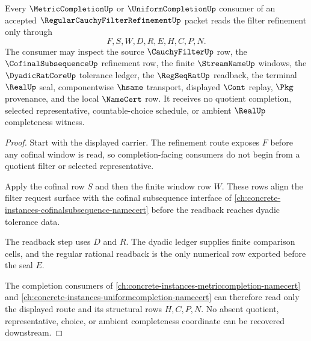 \begin{theorem}
\label{thm:regular-cauchy-filter-refinement-handoff}
Every $\MetricCompletionUp$ or $\UniformCompletionUp$ consumer of an accepted $\RegularCauchyFilterRefinementUp$ packet reads the filter refinement only through
$$
F,S,W,D,R,E,H,C,P,N .
$$
The consumer may inspect the source $\CauchyFilterUp$ row, the $\CofinalSubsequenceUp$ refinement row, the finite $\StreamNameUp$ windows, the $\DyadicRatCoreUp$ tolerance ledger, the $\RegSeqRatUp$ readback, the terminal $\RealUp$ seal, componentwise $\hsame$ transport, displayed $\Cont$ replay, $\Pkg$ provenance, and the local $\NameCert$ row. It receives no quotient completion, selected representative, countable-choice schedule, or ambient $\RealUp$ completeness witness.
\end{theorem}
\begin{proof}
Start with the displayed carrier. The refinement route exposes $F$ before any cofinal window is read, so completion-facing consumers do not begin from a quotient filter or selected representative.

Apply the cofinal row $S$ and then the finite window row $W$. These rows align the filter request surface with the cofinal subsequence interface of \autoref{ch:concrete-instances-cofinalsubsequence-namecert} before the readback reaches dyadic tolerance data.

The readback step uses $D$ and $R$. The dyadic ledger supplies finite comparison cells, and the regular rational readback is the only numerical row exported before the seal $E$.

The completion consumers of \autoref{ch:concrete-instances-metriccompletion-namecert} and \autoref{ch:concrete-instances-uniformcompletion-namecert} can therefore read only the displayed route and its structural rows $H,C,P,N$. No absent quotient, representative, choice, or ambient completeness coordinate can be recovered downstream.
\end{proof}


